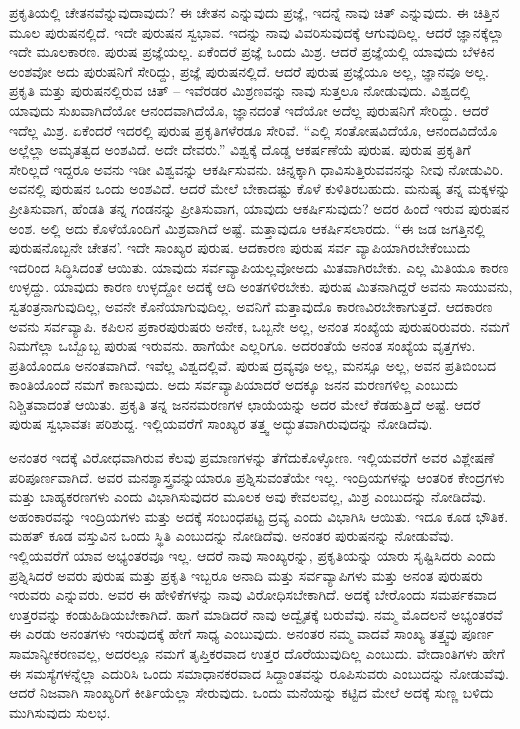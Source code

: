 ಪ್ರಕೃತಿಯಲ್ಲಿ ಚೇತನವೆನ್ನುವುದಾವುದು? ಈ ಚೇತನ ಎನ್ನುವುದು ಪ್ರಜ್ಞೆ, ಇದನ್ನೆ ನಾವು ಚಿತ್ ಎನ್ನುವುದು. ಈ ಚಿತ್ತಿನ ಮೂಲ ಪುರುಷನಲ್ಲಿದೆ. ಇದೇ ಪುರುಷನ ಸ್ವಭಾವ. ಇದನ್ನು ನಾವು ವಿವರಿಸುವುದಕ್ಕೆ ಆಗುವುದಿಲ್ಲ. ಆದರೆ ಜ್ಞಾನಕ್ಕೆಲ್ಲಾ ಇದೇ ಮೂಲಕಾರಣ. ಪುರುಷ ಪ್ರಜ್ಞೆಯಲ್ಲ. ಏಕೆಂದರೆ ಪ್ರಜ್ಞೆ ಒಂದು ಮಿಶ್ರ. ಆದರೆ ಪ್ರಜ್ಞೆಯಲ್ಲಿ ಯಾವುದು ಬೆಳಕಿನ ಅಂಶವೋ ಅದು ಪುರುಷನಿಗೆ ಸೇರಿದ್ದು, ಪ್ರಜ್ಞೆ ಪುರುಷನಲ್ಲಿದೆ. ಆದರೆ ಪುರುಷ ಪ್ರಜ್ಞೆಯೂ ಅಲ್ಲ, ಜ್ಞಾನವೂ ಅಲ್ಲ. ಪ್ರಕೃತಿ ಮತ್ತು ಪುರುಷನಲ್ಲಿರುವ ಚಿತ್ – ಇವೆರಡರ ಮಿಶ್ರಣವನ್ನು ನಾವು ಸುತ್ತಲೂ ನೋಡುವುದು. ವಿಶ್ವದಲ್ಲಿ ಯಾವುದು ಸುಖವಾಗಿದೆಯೋ ಆನಂದವಾಗಿದೆಯೊ, ಜ್ಞಾನದಂತೆ ಇದೆಯೋ ಅದೆಲ್ಲ ಪುರುಷನಿಗೆ ಸೇರಿದ್ದು. ಆದರೆ ಇದೆಲ್ಲ ಮಿಶ್ರ. ಏಕೆಂದರೆ ಇದರಲ್ಲಿ ಪುರುಷ ಪ್ರಕೃತಿಗಳೆರಡೂ ಸೇರಿವೆ. “ಎಲ್ಲಿ ಸಂತೋಷವಿದೆಯೊ, ಆನಂದವಿದೆಯೊ ಅಲ್ಲೆಲ್ಲಾ ಅಮೃತತ್ವದ ಅಂಶವಿದೆ. ಅದೇ ದೇವರು.'' ವಿಶ್ವಕ್ಕೆ ದೊಡ್ಡ ಆಕರ್ಷಣೆಯೆ ಪುರುಷ. ಪುರುಷ ಪ್ರಕೃತಿಗೆ ಸೇರಿಲ್ಲದೆ ಇದ್ದರೂ ಅವನು ಇಡೀ ವಿಶ್ವವನ್ನು ಆಕರ್ಷಿಸುವನು. ಚಿನ್ನಕ್ಕಾಗಿ ಧಾವಿಸುತ್ತಿರುವವನನ್ನು ನೀವು ನೋಡುವಿರಿ. ಅವನಲ್ಲಿ ಪುರುಷನ ಒಂದು ಅಂಶವಿದೆ. ಆದರೆ ಮೇಲೆ ಬೇಕಾದಷ್ಟು ಕೊಳೆ ಕುಳಿತಿರಬಹುದು. ಮನುಷ್ಯ ತನ್ನ ಮಕ್ಕಳನ್ನು ಪ್ರೀತಿಸುವಾಗ, ಹೆಂಡತಿ ತನ್ನ ಗಂಡನನ್ನು ಪ್ರೀತಿಸುವಾಗ, ಯಾವುದು ಆಕರ್ಷಿಸುವುದು? ಅದರ ಹಿಂದೆ ಇರುವ ಪುರುಷನ ಅಂಶ. ಅಲ್ಲಿ ಅದು ಕೊಳೆಯೊಂದಿಗೆ ಮಿಶ್ರವಾಗಿದೆ ಅಷ್ಟೆ. ಮತ್ತಾವುದೂ ಆಕರ್ಷಿಸಲಾರದು. “ಈ ಜಡ ಜಗತ್ತಿನಲ್ಲಿ ಪುರುಷನೊಬ್ಬನೇ ಚೇತನ'. ಇದೇ ಸಾಂಖ್ಯರ ಪುರುಷ. ಆದಕಾರಣ ಪುರುಷ ಸರ್ವ ವ್ಯಾಪಿಯಾಗಿರಬೇಕೆಂಬುದು ಇದರಿಂದ ಸಿದ್ಧಿಸಿದಂತೆ ಆಯಿತು. ಯಾವುದು ಸರ್ವವ್ಯಾಪಿಯಲ್ಲವೋ\break ಅದು ಮಿತವಾಗಿರಬೇಕು. ಎಲ್ಲ ಮಿತಿಯೂ ಕಾರಣ ಉಳ್ಳದ್ದು. ಯಾವುದು ಕಾರಣ ಉಳ್ಳದ್ದೋ ಅದಕ್ಕೆ ಆದಿ ಅಂತಗಳಿರಬೇಕು. ಪುರುಷ ಮಿತನಾಗಿದ್ದರೆ ಅವನು ಸಾಯುವನು, ಸ್ವತಂತ್ರನಾಗುವುದಿಲ್ಲ, ಅವನೇ ಕೊನೆಯಾಗುವುದಿಲ್ಲ. ಅವನಿಗೆ ಮತ್ತಾವುದೊ ಕಾರಣವಿರಬೇಕಾಗುತ್ತದೆ. ಆದಕಾರಣ ಅವನು ಸರ್ವವ್ಯಾಪಿ. ಕಪಿಲನ ಪ್ರಕಾರ\break ಪುರುಷರು ಅನೇಕ, ಒಬ್ಬನೇ ಅಲ್ಲ, ಅನಂತ ಸಂಖ್ಯೆಯ ಪುರುಷರಿರುವರು. ನಮಗೆ ನಿಮಗೆಲ್ಲಾ ಒಬ್ಬೊಬ್ಬ ಪುರುಷ ಇರುವನು. ಹಾಗೆಯೇ ಎಲ್ಲರಿಗೂ. ಅದರಂತೆಯೆ ಅನಂತ ಸಂಖ್ಯೆಯ ವೃತ್ತಗಳು. ಪ್ರತಿಯೊಂದೂ ಅನಂತವಾಗಿದೆ. ಇವೆಲ್ಲ ವಿಶ್ವದಲ್ಲಿವೆ. ಪುರುಷ ದ್ರವ್ಯವೂ ಅಲ್ಲ, ಮನಸ್ಸೂ ಅಲ್ಲ, ಅವನ ಪ್ರತಿಬಿಂಬದ ಕಾಂತಿಯೊಂದೆ ನಮಗೆ ಕಾಣುವುದು. ಅದು ಸರ್ವವ್ಯಾಪಿಯಾದರೆ ಅದಕ್ಕೂ ಜನನ ಮರಣಗಳಿಲ್ಲ ಎಂಬುದು ನಿಶ್ಚಿತವಾದಂತೆ ಆಯಿತು. ಪ್ರಕೃತಿ ತನ್ನ ಜನನಮರಣಗಳ ಛಾಯೆಯನ್ನು ಅದರ ಮೇಲೆ ಕೆಡಹುತ್ತಿದೆ ಅಷ್ಟೆ. ಆದರೆ ಪುರುಷ ಸ್ವಭಾವತಃ ಪರಿಶುದ್ದ. ಇಲ್ಲಿಯವರೆಗೆ ಸಾಂಖ್ಯರ ತತ್ತ್ವ ಅದ್ಭುತವಾಗಿರುವುದನ್ನು ನೋಡಿದೆವು.

ಅನಂತರ ಇದಕ್ಕೆ ವಿರೋಧವಾಗಿರುವ ಕೆಲವು ಪ್ರಮಾಣಗಳನ್ನು ತೆಗೆದುಕೊಳ್ಳೋಣ. ಇಲ್ಲಿಯವರೆಗೆ ಅವರ ವಿಶ್ಲೇಷಣೆ ಪರಿಪೂರ್ಣವಾಗಿದೆ. ಅವರ ಮನಶ್ಶಾಸ್ತ್ರವನ್ನು\break ಯಾರೂ ಪ್ರಶ್ನಿಸುವಂತೆಯೇ ಇಲ್ಲ. ಇಂದ್ರಿಯಗಳನ್ನು ಆಂತರಿಕ ಕೇಂದ್ರಗಳು ಮತ್ತು ಬಾಹ್ಯಕರಣಗಳು ಎಂದು ವಿಭಾಗಿಸುವುದರ ಮೂಲಕ ಅವು ಕೇವಲವಲ್ಲ, ಮಿಶ್ರ ಎಂಬುದನ್ನು ನೋಡಿದೆವು. ಅಹಂಕಾರವನ್ನು ಇಂದ್ರಿಯಗಳು ಮತ್ತು ಅದಕ್ಕೆ ಸಂಬಂಧಪಟ್ಟ ದ್ರವ್ಯ ಎಂದು ವಿಭಾಗಿಸಿ ಆಯಿತು. ಇದೂ ಕೂಡ ಭೌತಿಕ. ಮಹತ್ ಕೂಡ ವಸ್ತುವಿನ ಒಂದು ಸ್ಥಿತಿ ಎಂಬುದನ್ನು ನೋಡಿದೆವು. ಅನಂತರ ಪುರುಷನನ್ನು ನೋಡುವೆವು. ಇಲ್ಲಿಯವರೆಗೆ ಯಾವ ಅಭ್ಯಂತರವೂ ಇಲ್ಲ. ಆದರೆ ನಾವು ಸಾಂಖ್ಯರನ್ನು, ಪ್ರಕೃತಿಯನ್ನು ಯಾರು ಸೃಷ್ಟಿಸಿದರು ಎಂದು ಪ್ರಶ್ನಿಸಿದರೆ ಅವರು ಪುರುಷ ಮತ್ತು ಪ್ರಕೃತಿ ಇಬ್ಬರೂ ಅನಾದಿ ಮತ್ತು ಸರ್ವವ್ಯಾಪಿಗಳು ಮತ್ತು ಅನಂತ ಪುರುಷರು ಇರುವರು ಎನ್ನುವರು. ಅವರ ಈ ಹೇಳಿಕೆಗಳನ್ನು ನಾವು ವಿರೋಧಿಸಬೇಕಾಗಿದೆ. ಅದಕ್ಕೆ ಬೇರೊಂದು ಸಮರ್ಪಕವಾದ ಉತ್ತರವನ್ನು ಕಂಡುಹಿಡಿಯಬೇಕಾಗಿದೆ. ಹಾಗೆ ಮಾಡಿದರೆ ನಾವು ಅದ್ವೈತಕ್ಕೆ ಬರುವೆವು. ನಮ್ಮ ಮೊದಲನೆ ಅಭ್ಯಂತರವೆ ಈ ಎರಡು ಅನಂತಗಳು ಇರುವುದಕ್ಕೆ ಹೇಗೆ ಸಾಧ್ಯ ಎಂಬುವುದು. ಅನಂತರ ನಮ್ಮ ವಾದವೆ ಸಾಂಖ್ಯ ತತ್ತ್ವವು ಪೂರ್ಣ ಸಾಮಾನ್ಯೀಕರಣವಲ್ಲ, ಅದರಲ್ಲೂ ನಮಗೆ ತೃಪ್ತಿಕರವಾದ ಉತ್ತರ ದೊರೆಯುವುದಿಲ್ಲ ಎಂಬುದು. ವೇದಾಂತಿಗಳು ಹೇಗೆ ಈ ಸಮಸ್ಯೆಗಳನ್ನೆಲ್ಲಾ ಎದುರಿಸಿ ಒಂದು ಸಮಾಧಾನಕರವಾದ ಸಿದ್ದಾಂತವನ್ನು ರೂಪಿಸುವರು ಎಂಬುದನ್ನು ನೋಡುವೆವು. ಆದರೆ ನಿಜವಾಗಿ ಸಾಂಖ್ಯರಿಗೆ ಕೀರ್ತಿಯೆಲ್ಲಾ ಸೇರುವುದು. ಒಂದು ಮನೆಯನ್ನು ಕಟ್ಟಿದ ಮೇಲೆ ಅದಕ್ಕೆ ಸುಣ್ಣ ಬಳಿದು ಮುಗಿಸುವುದು ಸುಲಭ.

